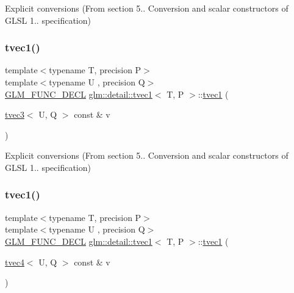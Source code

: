 Explicit conversions (From section 5.. Conversion and scalar constructors of G\+L\+SL 1.. specification) 

\mbox{\label{structglm_1_1detail_1_1tvec1_a553b324447da4de7c371c3d109317905}} 
\subsubsection{\texorpdfstring{tvec1()}{tvec1()}\hspace{0.1cm}{\footnotesize\ttfamily [8/14]}}
{\footnotesize\ttfamily template$<$typename T, precision P$>$ \\
template$<$typename U , precision Q$>$ \\
\hyperlink{setup_8hpp_ab2d052de21a70539923e9bcbf6e83a51}{G\+L\+M\+\_\+\+F\+U\+N\+C\+\_\+\+D\+E\+CL} \hyperlink{structglm_1_1detail_1_1tvec1}{glm\+::detail\+::tvec1}$<$ T, P $>$\+::\hyperlink{structglm_1_1detail_1_1tvec1}{tvec1} (\begin{DoxyParamCaption}\item[{\hyperlink{structglm_1_1detail_1_1tvec3}{tvec3}$<$ U, Q $>$ const \&}]{v }\end{DoxyParamCaption})\hspace{0.3cm}{\ttfamily [explicit]}}



Explicit conversions (From section 5.. Conversion and scalar constructors of G\+L\+SL 1.. specification) 

\mbox{\label{structglm_1_1detail_1_1tvec1_afa1ae0c07774e38092fc7c016ab28a58}} 
\subsubsection{\texorpdfstring{tvec1()}{tvec1()}\hspace{0.1cm}{\footnotesize\ttfamily [9/14]}}
{\footnotesize\ttfamily template$<$typename T, precision P$>$ \\
template$<$typename U , precision Q$>$ \\
\hyperlink{setup_8hpp_ab2d052de21a70539923e9bcbf6e83a51}{G\+L\+M\+\_\+\+F\+U\+N\+C\+\_\+\+D\+E\+CL} \hyperlink{structglm_1_1detail_1_1tvec1}{glm\+::detail\+::tvec1}$<$ T, P $>$\+::\hyperlink{structglm_1_1detail_1_1tvec1}{tvec1} (\begin{DoxyParamCaption}\item[{\hyperlink{structglm_1_1detail_1_1tvec4}{tvec4}$<$ U, Q $>$ const \&}]{v }\end{DoxyParamCaption})\hspace{0.3cm}{\ttfamily [explicit]}}



